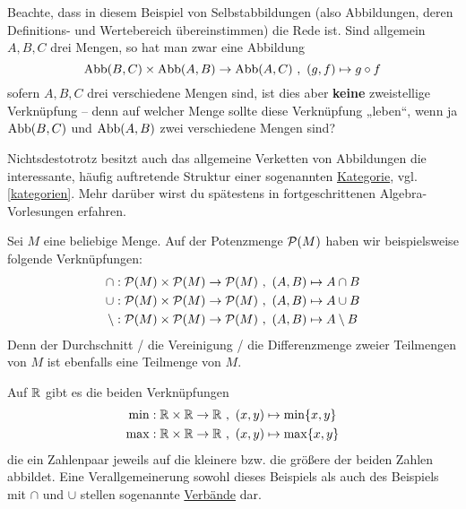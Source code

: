 \begin{bem}[*]
    Beachte, dass in diesem Beispiel von Selbstabbildungen (also Abbildungen, deren Definitions- und Wertebereich übereinstimmen) die Rede ist. Sind allgemein $A,B,C$ drei Mengen, so hat man zwar eine Abbildung
        \[ \Abb(B,C) \times \Abb(A,B) \to \Abb(A,C) \ ,\ (g,f) \mapsto g\circ f \]
    sofern $A,B,C$ drei verschiedene Mengen sind, ist dies aber \textbf{keine} zweistellige Verknüpfung -- denn auf welcher Menge sollte diese Verknüpfung „leben“, wenn ja $\operatorname{Abb}(B,C)$ und $\operatorname{Abb}(A,B)$ zwei verschiedene Mengen sind?
    
    Nichtsdestotrotz besitzt auch das allgemeine Verketten von Abbildungen die interessante, häufig auftretende Struktur einer sogenannten \href{https://ncatlab.org/nlab/show/category}{Kategorie}, vgl. \cref{kategorien}. Mehr darüber wirst du spätestens in fortgeschrittenen Algebra-Vorlesungen erfahren.
\end{bem}


\begin{bsp}
    Sei $M$ eine beliebige Menge. Auf der Potenzmenge $\mathcal P(M)$ haben wir beispielsweise folgende Verknüpfungen:
    \begin{align*}
        \cap : \calP(M)\times \calP(M) \to \calP(M) \ & ,\ (A,B)\mapsto A\cap B \\
        \cup : \calP(M)\times \calP(M) \to \calP(M) \ &,\ (A,B)\mapsto A\cup B \\
        \setminus : \calP(M)\times \calP(M) \to \calP(M) \ &,\ (A,B)\mapsto A\setminus B
    \end{align*}
    Denn der Durchschnitt / die Vereinigung / die Differenzmenge zweier Teilmengen von $M$ ist ebenfalls eine Teilmenge von $M$.
\end{bsp}


\begin{bsp} \label{bsp:minmaxverknuepfung}
    Auf $\mathbb R$ gibt es die beiden Verknüpfungen
    \begin{align*}
        \min : \mathbb R\times \mathbb R\to \mathbb R\ &,\ (x,y)\mapsto \min\{x,y\} \\
        \max : \mathbb R\times \mathbb R\to \mathbb R\ &,\ (x,y)\mapsto \max\{x,y\}
    \end{align*}
    die ein Zahlenpaar jeweils auf die kleinere bzw. die größere der beiden Zahlen abbildet. Eine Verallgemeinerung sowohl dieses Beispiels als auch des Beispiels mit $\cap$ und $\cup$ stellen sogenannte \href{https://de.wikipedia.org/wiki/Verband_(Mathematik)}{Verbände} dar.
\end{bsp}


